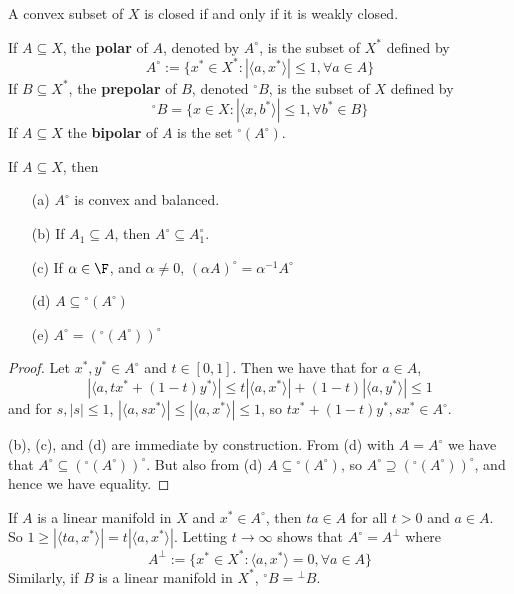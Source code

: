 \begin{cor}
    A convex subset of $X$ is closed if and only if it is weakly closed.
\end{cor}


\begin{defn}
    If $A \subseteq X$, the \textbf{polar} of $A$, denoted by $A^{\circ}$, is the subset of $X^*$ defined by $$A^{\circ} := \{x^* \in X^*:|\langle a,x^*\rangle| \leq 1,\forall a \in A\}$$
    If $B \subseteq X^*$, the \textbf{prepolar} of $B$, denoted ${}^{\circ}B$, is the subset of $X$ defined by $${}^{\circ}B = \{x \in X:|\langle x,b^*\rangle| \leq 1,\forall b^* \in B\}$$
    If $A \subseteq X$ the \textbf{bipolar} of $A$ is the set ${}^{\circ}(A^{\circ})$.
\end{defn}


\begin{prop}
    If $A \subseteq X$, then \begin{itemize}
        \item[(a)] $A^{\circ}$ is convex and balanced. 
        \item[(b)] If $A_1 \subseteq A$, then $A^{\circ} \subseteq A^{\circ}_1$.
        \item[(c)] If $\alpha \in \F$, and $\alpha \neq 0$, $(\alpha A)^{\circ} = \alpha^{-1}A^{\circ}$
        \item[(d)] $A \subseteq {}^{\circ}(A^{\circ})$
        \item[(e)] $A^{\circ}=({}^{\circ}(A^{\circ}))^{\circ}$
    \end{itemize}
\end{prop}
\begin{proof}
    Let $x^*,y^* \in A^{\circ}$ and $t \in [0,1]$. Then we have that for $a \in A$, $$|\langle a,tx^*+(1-t)y^*\rangle|\leq t|\langle a,x^*\rangle|+(1-t)|\langle a,y^*\rangle| \leq 1$$
    and for $s, |s| \leq 1$, $|\langle a,sx^*\rangle| \leq |\langle a,x^*\rangle| \leq 1$, so $tx^*+(1-t)y^*,sx^* \in A^{\circ}$.

    (b), (c), and (d) are immediate by construction. From (d) with $A = A^{\circ}$ we have that $A^{\circ} \subseteq ({}^{\circ}(A^{\circ}))^{\circ}$. But also from (d) $A \subseteq {}^{\circ}(A^{\circ})$, so $A^{\circ} \supseteq ({}^{\circ}(A^{\circ}))^{\circ}$, and hence we have equality.
\end{proof}

If $A$ is a linear manifold in $X$ and $x^* \in A^{\circ}$, then $ta \in A$ for all $t > 0$ and $a \in A$. So $1 \geq |\langle ta,x^*\rangle| = t|\langle a,x^*\rangle|$. Letting $t\rightarrow \infty$ shows that $A^{\circ} = A^{\perp}$ where $$A^{\perp} := \{x^* \in X^*:\langle a,x^*\rangle = 0,\forall a\in A\}$$
Similarly, if $B$ is a linear manifold in $X^*$, ${}^{\circ}B = {}^{\perp}B$.


